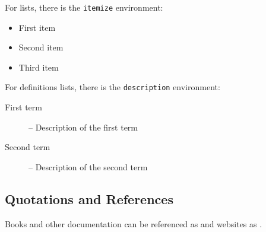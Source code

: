 \documentclass[12pt,a4paper]{article}
\begin{document}
\noindent For lists, there is the
\texttt{itemize} environment:
%
\begin{itemize}
  \item First item
  \item Second item
  \item Third item
\end{itemize}

\noindent For definitions lists, there is the \texttt{description} environment:
\begin{description}
\item[First term] -- Description of the first term
\item[Second term] -- Description of the second term
\end{description}

\subsection{Quotations and References}
Books and other documentation can be referenced as \cite{Braitenberg} and
websites as \cite{AsebaManual}.
\end{document}
